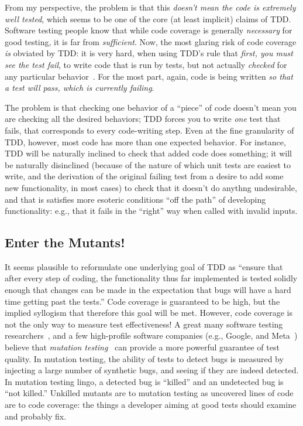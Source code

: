 \documentclass[sigplan,screen]{acmart}
\begin{document}
From my perspective, the problem is that this \emph{doesn't mean the
  code is extremely well tested}, which seems to be one of the core
(at least implicit) claims of TDD.  Software testing people know that
while code coverage is generally \emph{necessary} for good testing, it
is far from \emph{sufficient}.  Now, the most glaring risk of code
coverage \emph{is} obviated by TDD:  it is very hard, when using TDD's
rule that \emph{first, you must see the test fail}, to write code
that is run by tests, but not actually \emph{checked} for any
particular behavior~\cite{Schuler2011AssessingOQ}.  For the most part,
again, code is being written \emph{so that a test will pass, which is
  currently failing}.

The problem is that checking one behavior of a ``piece'' of code
doesn't mean you are checking all the desired behaviors; TDD forces
you to write \emph{one} test that fails, that corresponds to every
code-writing step.  Even at the fine granularity of TDD, however, most
code has more than one expected behavior.  For instance, TDD will be
naturally inclined to check that added code does something; it will be
naturally disinclined (because of the nature of which unit tests are
easiest to write, and the
derivation of the original failing test from a desire to add some new
functionality, in most cases) to check that it doesn't do anythng
undesirable, and that is satisfies more esoteric conditions ``off the
path'' of developing functionality: e.g., that it fails in the ``right'' way when called with
invalid inputs.

\subsection{Enter the Mutants!}

It seems plausible to reformulate one underlying goal of TDD as
``ensure that after every step of coding, the functionality thus far
implemented is tested solidly enough that changes can be made in the
expectation that bugs will have a hard time getting past the tests.''
Code coverage is guaranteed to be high, but the implied syllogism that
therefore this goal will be met.  However, code coverage is not the
only way to measure test effectiveness!  A great many software testing
researchers~\cite{JustMut,CleanCode,Discontents,MutationSurvey}, and a few high-profile software companies (e.g., Google,
and Meta~\cite{PetrovicMutationGoogle,BellerFacebookMutation}) believe that \emph{mutation testing}~\cite{demillo1978hints,budd1979mutation} can provide a more
powerful guarantee of test quality.  In mutation testing, the ability
of tests to detect bugs is measured by injecting a large number of
synthetic bugs, and seeing if they are indeed detected.  In mutation
testing lingo, a detected bug is ``killed'' and an undetected bug is
``not killed.''  Unkilled mutants are to mutation testing as uncovered
lines of code are to code coverage:  the things a developer aiming at
good tests should examine and probably fix.
\end{document}
